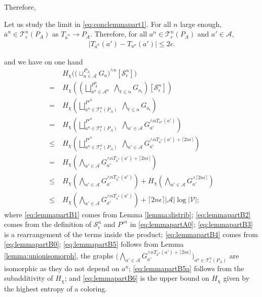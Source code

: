 \documentclass[conference,a4paper]{IEEEtran}
\begin{document}
Therefore, 
\fi

Let us study the limit in \eqref{eq:conclemmapart1}. For all $n$ large enough, $\overline{a}^n \in \mathcal{T}^n_\epsilon(P_A)$ as $T_{\overline{a}^n} \rightarrow P_A$. Therefore, for all $a^n \in \mathcal{T}^n_\epsilon(P_A)$ and $a' \in \mathcal{A}$,
\begin{align}
    \big|T_{\overline{a}^n}(a')-T_{a^n}(a')\big|\leq 2\epsilon.\label{eq:lemmapartB0}
\end{align}

and we have on one hand
\begin{align}
    & H_\chi\Big(\big({\sqcup}^{P_A}_{a \in \mathcal{A}} G_a\big)^{\wedge n}[\mathcal{S}^n_\epsilon]\Big) \nonumber\\
    =  \; & H_\chi\left(\left(\bigsqcup_{a^n \in \mathcal{A}^n}^{P_A^n} \; \bigwedge_{t \leq n} G_{a_t}\right)[\mathcal{S}^n_\epsilon]\right) \label{eq:lemmapartB1} \\
    = \; & H_\chi\left(\bigsqcup_{a^n \in \mathcal{T}^n_\epsilon(P_A)}^{P'^n} \; \bigwedge_{t \leq n} G_{a_t}\right) \label{eq:lemmapartB2} \\
    = \; & H_\chi\left(\bigsqcup_{a^n \in \mathcal{T}^n_\epsilon(P_A)}^{P'^n} \; \bigwedge_{a' \in \mathcal{A}} G_{a'}^{\wedge n T_{a^n}(a')}\right) \label{eq:lemmapartB3} \\
    \leq \; & H_\chi\left(\bigsqcup_{a^n \in \mathcal{T}^n_\epsilon(P_A)}^{P'^n} \; \bigwedge_{a' \in \mathcal{A}} G_{a'}^{\wedge n T_{\overline{a}^n}(a') + \lceil 2 n\epsilon \rceil}\right) \label{eq:lemmapartB4} \\
    = \; & H_\chi\left(\bigwedge_{a' \in \mathcal{A}} G_{a'}^{\wedge n T_{\overline{a}^n}(a') + \lceil 2 n\epsilon \rceil}\right) \label{eq:lemmapartB5} \\
    \leq \; & H_\chi\left(\bigwedge_{a' \in \mathcal{A}} G_{a'}^{\wedge n T_{\overline{a}^n}(a')}\right) + H_\chi\left(\bigwedge_{a' \in \mathcal{A}} G_{a'}^{\wedge \lceil 2 n\epsilon\rceil}\right) \label{eq:lemmapartB5a} \\
    \leq \; & H_\chi\left(\bigwedge_{a' \in \mathcal{A}} G_{a'}^{\wedge n T_{\overline{a}^n}(a')}\right) + \lceil 2 n\epsilon \rceil|\mathcal{A}|\log|\mathcal{V}|;\label{eq:lemmapartB6}
\end{align}
where \eqref{eq:lemmapartB1} comes from Lemma \ref{lemma:distrib}; \eqref{eq:lemmapartB2} comes from the definition of $\mathcal{S}_\epsilon^n$ and $P'^n$ in \eqref{eq:lemmapartA0}; \eqref{eq:lemmapartB3} is a rearrangement of the terms inside the product; \eqref{eq:lemmapartB4} comes from \eqref{eq:lemmapartB0}; \eqref{eq:lemmapartB5} follows from Lemma \ref{lemma:unionisomorph}, the graphs $\big(\bigwedge_{a' \in \mathcal{A}} G_{a'}^{\wedge n T_{\overline{a}^n}(a') + \lceil 2 n\epsilon \rceil}\big)_{a^n \in \mathcal{T}^n_\epsilon(P_A)}$ are isomorphic as they do not depend on $a^n$; \eqref{eq:lemmapartB5a} follows from the subadditivity of $H_\chi$; and \eqref{eq:lemmapartB6} is the upper bound on $H_\chi$ given by the highest entropy of a coloring.
\end{document}
